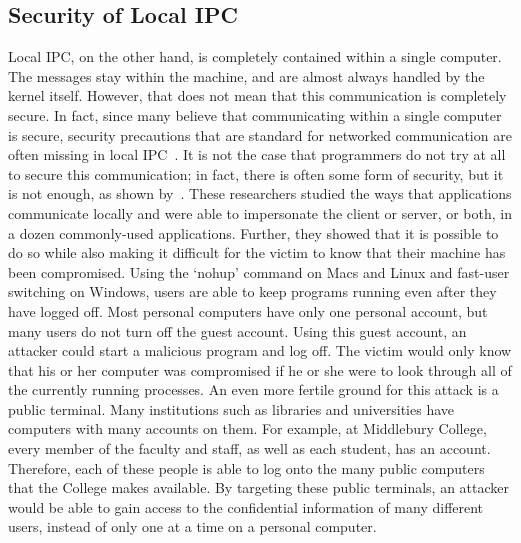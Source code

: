 \subsection{Security of Local IPC}
\label{sec:localIPCSecurity}
Local IPC, on the other hand, is completely contained within a single computer.  The messages stay within the machine, and are almost always handled by the kernel itself.  However, that does not mean that this communication is completely secure.  In fact, since many believe that communicating within a single computer is secure, security precautions that are standard for networked communication are often missing in local IPC~\cite{MitMa}.  It is not the case that programmers do not try at all to secure this communication; in fact, there is often some form of security, but it is not enough, as shown by~\cite{MitMa}.  These researchers studied the ways that applications communicate locally and were able to impersonate the client or server, or both, in a dozen commonly-used applications.  Further, they showed that it is possible to do so while also making it difficult for the victim to know that their machine has been compromised.  Using the `nohup' command on Macs and Linux and fast-user switching on Windows, users are able to keep programs running even after they have logged off.  Most personal computers have only one personal account, but many users do not turn off the guest account.  Using this guest account, an attacker could start a malicious program and log off.  The victim would only know that his or her computer was compromised if he or she were to look through all of the currently running processes.  An even more fertile ground for this attack is a public terminal.  Many institutions such as libraries and universities have computers with many accounts on them.  For example, at Middlebury College, every member of the faculty and staff, as well as each student, has an account.  Therefore, each of these people is able to log onto the many public computers that the College makes available.  By targeting these public terminals, an attacker would be able to gain access to the confidential information of many different users, instead of only one at a time on a personal computer.


